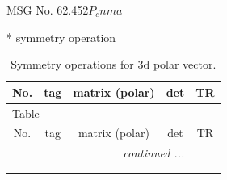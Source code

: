 \documentclass[fleqn,8pt]{jsarticle}
\begin{document}
\setcounter{MaxMatrixCols}{32}

\renewcommand{\tablename}{Table~}
\renewcommand{\figurename}{Figure~}
\begin{center}
\LARGE
MSG No. 62.452\quad$P_{c}nma$
\end{center}
* symmetry operation
\renewcommand{\arraystretch}{1.3}
\begin{longtable}{ccccc}
\caption{Symmetry operations for 3d polar vector.}
 \\
 \hline \hline
No. & tag & matrix (polar) & det & TR \\ \hline \endfirsthead

\multicolumn{4}{l}{\tablename\ \thetable{}} \\
 \hline \hline
No. & tag & matrix (polar) & det & TR \\ \hline \endhead

 \hline \hline
\multicolumn{4}{r}{\footnotesize\it continued ...} \\ \endfoot

 \hline \hline
\multicolumn{4}{r}{} \\ \endlastfoot


\end{longtable}
\end{document}
